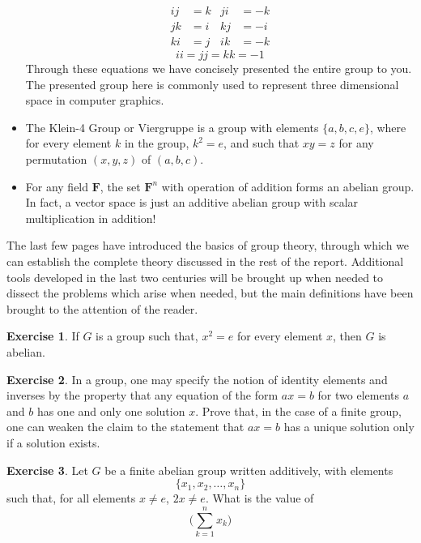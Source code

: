 \documentclass[12pt]{amsbook}
\theoremstyle{definition}
\newtheorem{exercise}{Exercise}[chapter]
\begin{document}
\begin{itemize}
    \begin{align*}
                   ij &= k & ji &= -k\\
                   jk &= i & kj &= -i\\
                   ki &= j & ik &= -k
    \end{align*}
    \[ii = jj = kk = -1\]
    Through these equations we have concisely presented the entire group to you. The presented group here is commonly used to represent three dimensional space in computer graphics.
    \item The Klein-4 Group  or Viergruppe  is a group with elements $\{ a,b,c,e \}$, where for every element $k$ in the group, $k^2 = e$, and such that $xy = z$ for any permutation $(x,y,z)$ of $(a,b,c)$.
    \item For any field $\mathbf{F}$, the set $\mathbf{F}^n$ with operation of addition forms an abelian group. In fact, a vector space is just an additive abelian group with scalar multiplication in addition!
\end{itemize}

The last few pages have introduced the basics of group theory, through which we can establish the complete theory discussed in the rest of the report. Additional tools developed in the last two centuries will be brought up when needed to dissect the problems which arise when needed, but the main definitions have been brought to the attention of the reader.

\clearpage

\begin{exercise}
    If $G$ is a group such that, $x^2 = e$ for every element $x$, then $G$ is abelian.
\end{exercise}

\begin{exercise}
    In a group, one may specify the notion of identity elements and inverses by the property that any equation of the form $ax = b$ for two elements $a$ and $b$ has one and only one solution $x$. Prove that, in the case of a finite group, one can weaken the claim to the statement that $ax = b$ has a unique solution only if a solution exists.
\end{exercise}

\begin{exercise}
    Let $G$ be a finite abelian group written additively, with elements
    \[ \{ x_1, x_2, \dots, x_n \} \]
    such that, for all elements $x \neq e$, $2x \neq e$. What is the value of
    \[ \bigg( \sum_{k = 1}^n x_k \bigg) \]
\end{exercise}
\end{document}
